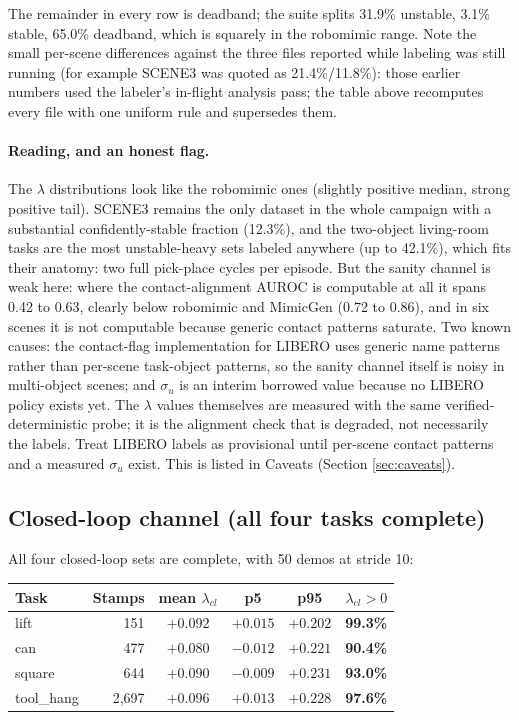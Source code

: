 \documentclass[11pt]{article}
\begin{document}
The remainder in every row is deadband; the suite splits 31.9\% unstable, 3.1\%
stable, 65.0\% deadband, which is squarely in the robomimic range. Note the small
per-scene differences against the three files reported while labeling was still
running (for example SCENE3 was quoted as 21.4\%/11.8\%): those earlier numbers
used the labeler's in-flight analysis pass; the table above recomputes every file
with one uniform rule and supersedes them.

\paragraph{Reading, and an honest flag.} The $\lambda$ distributions look like the
robomimic ones (slightly positive median, strong positive tail). SCENE3 remains the
only dataset in the whole campaign with a substantial confidently-stable fraction
(12.3\%), and the two-object living-room tasks are the most unstable-heavy sets
labeled anywhere (up to 42.1\%), which fits their anatomy: two full
pick-place cycles per episode. But the sanity channel is weak here: where the
contact-alignment AUROC is computable at all it spans 0.42 to 0.63, clearly below
robomimic and MimicGen (0.72 to 0.86), and in six scenes it is not computable
because generic contact patterns saturate. Two known causes: the contact-flag
implementation for LIBERO uses generic name patterns rather than per-scene
task-object patterns, so the sanity channel itself is noisy in multi-object scenes;
and $\sigma_u$ is an interim borrowed value because no LIBERO policy exists yet.
The $\lambda$ values themselves are measured with the same verified-deterministic
probe; it is the alignment check that is degraded, not necessarily the labels.
Treat LIBERO labels as provisional until per-scene contact patterns and a measured
$\sigma_u$ exist. This is listed in Caveats (Section \ref{sec:caveats}).

\subsection{Closed-loop channel (all four tasks complete)}

All four closed-loop sets are complete, with 50 demos at stride 10:

\begin{center}
\small
\begin{tabular}{@{}lrcccc@{}}
\toprule
Task & Stamps & mean $\lambda_{cl}$ & p5 & p95 & $\lambda_{cl} > 0$ \\
\midrule
lift        & 151     & $+0.092$ & $+0.015$ & $+0.202$ & \textbf{99.3\%} \\
can         & 477     & $+0.080$ & $-0.012$ & $+0.221$ & \textbf{90.4\%} \\
square      & 644     & $+0.090$ & $-0.009$ & $+0.231$ & \textbf{93.0\%} \\
tool\_hang  & 2{,}697 & $+0.096$ & $+0.013$ & $+0.228$ & \textbf{97.6\%} \\
\bottomrule
\end{tabular}
\end{center}
\end{document}
